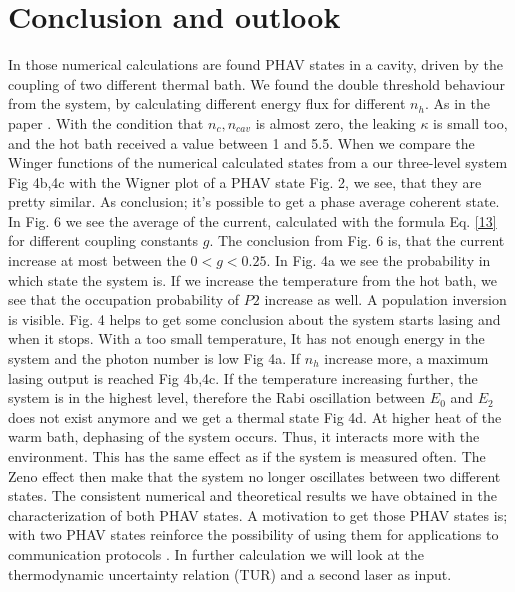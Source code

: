 \documentclass[12pt,a4paper]{article}
\begin{document}
\section{Conclusion and outlook}
In those numerical calculations are found PHAV states in a cavity, driven by the coupling of two different thermal bath. We found the double threshold behaviour from the system, by calculating different energy flux for different $n_h$. As in the paper \cite{Li2017}.
With the condition that $n_c, n_{cav}$ is almost zero, the leaking $\kappa$ is small too, and the hot bath received a value between 1 and 5.5. When we compare the Winger functions of the numerical calculated states from a our three-level system Fig 4b,4c with the Wigner plot of a PHAV state Fig. 2, we see, that they are pretty similar. As conclusion; it's possible to get a phase average coherent state. 
In Fig. 6 we see the average of the current, calculated with the formula Eq. \eqref{13} for different coupling constants $g$.
The conclusion from Fig. 6 is, that the current increase at most between the $ 0<g<0.25$.
In Fig. 4a we see the probability in which state the  system is. If we increase the temperature from the hot bath, we see that the occupation probability of $P2$ increase as well. A  population  inversion is visible.
Fig. 4 helps to get some conclusion about the system starts lasing and when it stops. With a too small temperature, It has not enough energy in the system and the photon number is low Fig 4a. If $n_h$ increase more, a maximum lasing output is reached  Fig 4b,4c. If the temperature increasing further, the system is in the highest level, therefore the Rabi oscillation between $E_0$ and $E_2$ does not exist anymore and we get a thermal state Fig 4d.
At higher heat of the warm bath, dephasing of the system occurs. Thus, it interacts more with the environment. This has the same effect as if the system is measured often. The Zeno effect then make that the system no longer oscillates between two different states. 
The consistent numerical and theoretical results we have obtained in the characterization of both PHAV states.
A motivation to get those PHAV states is; with two PHAV states reinforce the
possibility of using them for applications to communication protocols \cite{Allevi2013}.
In further calculation  we will look at the thermodynamic uncertainty relation (TUR) and a second laser as input.
%
\printbibliography
\end{document}
